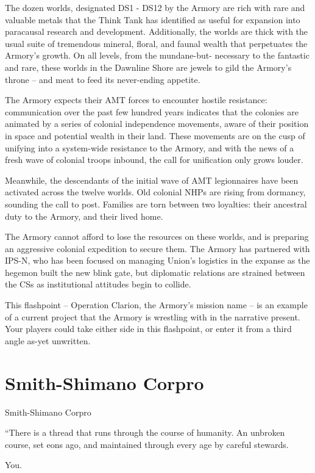 The dozen worlds, designated DS1 - DS12 by the Armory are rich with rare and valuable metals
that the Think Tank has identified as useful for expansion into paracausal research and
development. Additionally, the worlds are thick with the usual suite of tremendous mineral, floral,
and faunal wealth that perpetuates the Armory’s growth. On all levels, from the mundane-but-
necessary to the fantastic and rare, these worlds in the Dawnline Shore are jewels to gild the
Armory’s throne -- and meat to feed its never-ending appetite.


The Armory expects their AMT forces to encounter hostile resistance: communication over the
past few hundred years indicates that the colonies are animated by a series of colonial
independence movements, aware of their position in space and potential wealth in their land.
These movements are on the cusp of unifying into a system-wide resistance to the Armory, and
with the news of a fresh wave of colonial troops inbound, the call for unification only grows
louder.


Meanwhile, the descendants of the initial wave of AMT legionnaires have been activated across
the twelve worlds. Old colonial NHPs are rising from dormancy, sounding the call to post.
Families are torn between two loyalties: their ancestral duty to the Armory, and their lived home.


The Armory cannot afford to lose the resources on these worlds, and is preparing an aggressive
colonial expedition to secure them. The Armory has partnered with IPS-N, who has been focused
on managing Union’s logistics in the expanse as the hegemon built the new blink gate, but
diplomatic relations are strained between the CSs as institutional attitudes begin to collide.


This flashpoint -- Operation Clarion, the Armory’s mission name -- is an example of a current
project that the Armory is wrestling with in the narrative present. Your players could take either
side in this flashpoint, or enter it from a third angle as-yet unwritten.

\section{Smith-Shimano Corpro}
Smith-Shimano Corpro

         “There is a thread that runs through the course of humanity. An unbroken course,
         set eons ago, and maintained through every age by careful stewards.

         You.

